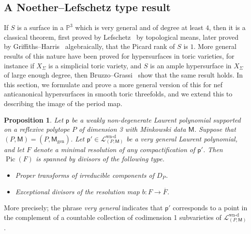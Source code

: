 \documentclass[10pt]{amsart}
\numberwithin{equation}{section}
\theoremstyle{plain}
\newtheorem{proposition}[theorem]{Proposition}
\theoremstyle{definition}
\theoremstyle{remark}
\DeclareMathOperator{\gen}{gen}
\DeclareMathOperator{\Pic}{Pic}
\begin{document}
\subsection{A Noether--Lefschetz type result}

If \(S\) is a surface in a \(\mathbb{P}^3\) which is very general and of degree at least \(4\), then it is a classical theorem, first proved by Lefschetz~\cite{lefschetz1924analysis} by topological means, later proved by Griffiths--Harris~\cite{griffiths1985noether} algebraically, that the Picard rank of \(S\) is \(1\). More general results of this nature have been proved for hypersurfaces in toric varieties, for instance if \(X_\Sigma\) is a simplicial toric variety, and \(S\) is an ample hypersurface in \(X_\Sigma\) of large enough degree, then Bruzzo--Grassi~\cite{bruzzo2012picard} show that the same result holds. In this section, we formulate and prove a more general version of this for nef anticanonical hypersurfaces in smooth toric threefolds, and we extend this to describing the image of the period map.

\begin{proposition}\label{proposition:nl}
  Let \(\mathsf{p}\) be a weakly non-degenerate Laurent polynomial supported on a reflexive polytope \(P\) of dimension 3 with Minkowski data \(\mathsf{M}\). Suppose that \((P,\mathsf{M}) = (P,\mathsf{M}_{\gen})\). Let \(\mathsf{p}'\in \mathcal{L}^{\text{wn-d}}_{(P,\mathsf{M})}\) be a very general Laurent polynomial, and let \(F\) denote a minimal resolution of any compactification of \(\mathsf{p}'\). Then \(\Pic(F)\) is spanned by divisors of the following type.
  \begin{itemize}
  \item Proper transforms of irreducible components of \(D_P\).
  \item Exceptional divisors of the resolution map \(b :F\rightarrow \overline{F}\).
  \end{itemize}
\end{proposition}

More precisely; the phrase \emph{very general} indicates that \(\mathsf{p}'\) corresponds to a point in the complement of a countable collection of codimension 1 subvarieties of \(\mathcal{L}^{\text{wn-d}}_{(P,\mathsf{M})}\).
\end{document}
